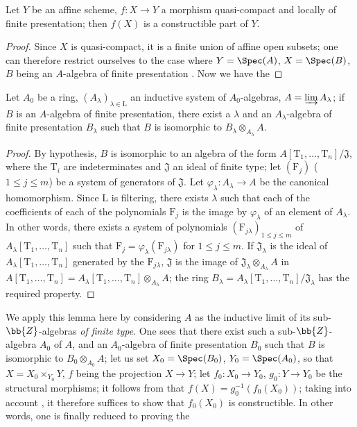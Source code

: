 \begin{lemma}[1.8.4.1]
\label{IV.1.8.4.1}
Let $Y$ be an affine scheme, $f:X\to Y$ a morphism quasi-compact and locally of finite presentation; then $f(X)$ is a constructible part of $Y$.
\end{lemma}

\begin{proof}
Since $X$ is quasi-compact, it is a finite union of affine open subsets; one can therefore restrict ourselves to the case where $Y=\Spec(A)$, $X=\Spec(B)$, $B$ being an $A$-algebra of finite presentation .
Now we have the
\end{proof}

\begin{lemma}[1.8.4.2]
\label{IV.1.8.4.2}
Let $A_0$ be a ring, $(A_\lambda)_{\lambda\in\mathrm{L}}$ an inductive system of $A_0$-algebras, $A=\varinjlim A_\lambda$; if $B$ is an $A$-algebra of finite presentation, there exist a $\lambda$ and an $A_\lambda$-algebra of finite presentation $B_\lambda$ such that $B$ is isomorphic to $B_\lambda\otimes_{A_\lambda} A$.
\end{lemma}

\begin{proof}
By hypothesis, $B$ is isomorphic to an algebra of the form $A[\mathrm{T}_1,\ldots,\mathrm{T}_n]/\mathfrak{J}$, where the $\mathrm{T}_i$ are indeterminates and $\mathfrak{J}$ an ideal of finite type; let $(\mathrm{F}_j)$ ($1\leq j\leq m$) be a system of generators of $\mathfrak{J}$.
Let $\varphi_\lambda:A_\lambda\to A$ be the canonical homomorphism.
Since $\mathrm{L}$ is filtering, there exists $\lambda$ such that each of the coefficients of each of the polynomials $\mathrm{F}_j$ is the image by $\varphi_\lambda$ of an element of $A_\lambda$.
In other words, there exists a system of polynomials $(\mathrm{F}_{j\lambda})_{1\leq j\leq m}$ of $A_\lambda[\mathrm{T}_1,\ldots,\mathrm{T}_n]$ such that $\mathrm{F}_j=\varphi_\lambda(\mathrm{F}_{j\lambda})$ for $1\leq j\leq m$.
If $\mathfrak{J}_\lambda$ is the ideal of $A_\lambda[\mathrm{T}_1,\ldots,\mathrm{T}_n]$ generated by the $\mathrm{F}_{j\lambda}$, $\mathfrak{J}$ is the image of $\mathfrak{J}_\lambda\otimes_{A_\lambda} A$ in $A[\mathrm{T}_1,\ldots,\mathrm{T}_n]=A_\lambda[\mathrm{T}_1,\ldots,\mathrm{T}_n]\otimes_{A_\lambda} A$; the ring $B_\lambda=A_\lambda[\mathrm{T}_1,\ldots,\mathrm{T}_n]/\mathfrak{J}_\lambda$ has the required property.
\end{proof}

We apply this lemma here by considering $A$ as the inductive limit of its sub-$\bb{Z}$-algebras \emph{of finite type}.
One sees that there exist such a sub-$\bb{Z}$-algebra $A_0$ of $A$, and an $A_0$-algebra of finite presentation $B_0$ such that $B$ is isomorphic to $B_0\otimes_{A_0} A$; let us set $X_0=\Spec(B_0)$, $Y_0=\Spec(A_0)$, so that $X=X_0\times_{Y_0} Y$, $f$ being the projection $X\to Y$; let $f_0:X_0\to Y_0$, $g_0:Y\to Y_0$ be the structural morphisms; it follows from  that $f(X)=g_0^{-1}(f_0(X_0))$; taking into account , it therefore suffices to show that $f_0(X_0)$ is constructible.
In other words, one is finally reduced to proving the

